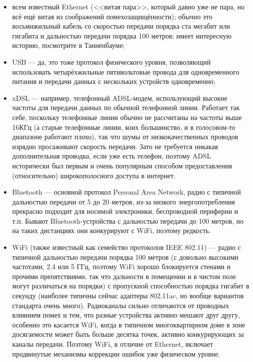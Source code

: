 \documentclass[a5paper]{article}
\begin{document}
\begin{itemize}
    \item всем известный Ethernet (<<витая пара>>, который давно уже не пара, но всё ещё витая из соображений помехозащищённости); обычно это восьмижильный кабель со скоростью передачи порядка ста мегабит или гигабита и дальностью передачи порядка 100 метров; имеет интересную историю, посмотрите в Танненбауме;
    \item USB --- да, это тоже протокол физического уровня, позволяющий использовать четырёхжильные пятивольтовые провода для одновременного питания и передачи данных с нескольких устройств одновременно;
    \item xDSL --- например, телефонный ADSL-модем, использующий высокие частоты для передачи данных по обычной телефонной линии. Работает так себе, поскольку телефонные линии обычно не рассчитаны на частоты выше 16КГц (а старые телефонные линии, коих большинство, и в голосовом-то диапазоне работают плохо), так что шумы от низкокачественных проводов изрядно просаживают скорость передачи. Зато не требуется никакая дополнительная проводка, если уже есть телефон, поэтому ADSL исторически был первым и очень популярным способом предоставления (относительно) широкополосного доступа в интернет.
    \item Bluetooth --- основной протокол Personal Area Network, радио с типичной дальностью передачи от 5 до 20 метров, из-за низкого энергопотребления прекрасно подходит для носимой электроники, беспроводной периферии и т.п. Бывают Bluetooth-устройства с дальностью передачи до 100 метров, но на таких дистанциях они конкурируют с WiFi, поэтому редкость.
    \item WiFi (также известный как семейство протоколов IEEE 802.11) --- радио с типичной дальностью передачи порядка 100 метров (с довольно высокими частотами, 2.4 или 5 ГГц, поэтому WiFi хорошо блокируется стенами и прочими препятствиями, так что дальности в помещении и в чистом поле могут различаться на порядки) с пропускной способностью порядка гигабит в секунду (наиболее типичны сейчас адаптеры 802.11ac, но вообще вариантов стандарта очень много). Радиоканалы сильно отличаются от проводных влиянием помех и тем, что разные устройства активно мешают друг другу, особенно это касается WiFi, когда в типичном многоквартирном доме в зоне досягаемости может быть больше десятка точек, активно конкурирующих за каналы передачи. Поэтому WiFi, в отличие от Ethernet, включает продвинутые механизмы коррекции ошибок уже физическом уровне.

\end{itemize}
\end{document}

